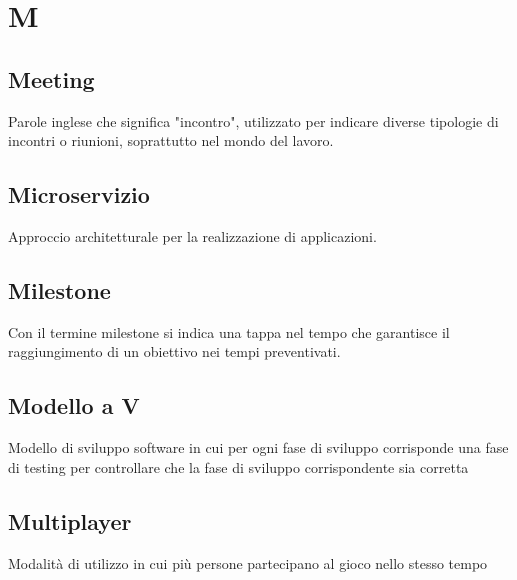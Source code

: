 \section{M}
	\subsection{Meeting}
		Parole inglese che significa "incontro", utilizzato per indicare diverse tipologie di incontri o riunioni, soprattutto nel mondo del lavoro.
	\subsection{Microservizio}
		Approccio architetturale per la realizzazione di applicazioni.
	\subsection{Milestone}  
		Con il termine milestone si indica una tappa nel tempo che garantisce il raggiungimento di un obiettivo nei tempi preventivati.
	\subsection{Modello a V}  
		Modello di sviluppo software in cui per ogni fase di sviluppo corrisponde una fase di testing per controllare che la fase di sviluppo corrispondente sia corretta
	\subsection{Multiplayer}
		Modalità di utilizzo in cui più persone partecipano al gioco nello stesso tempo

\newpage